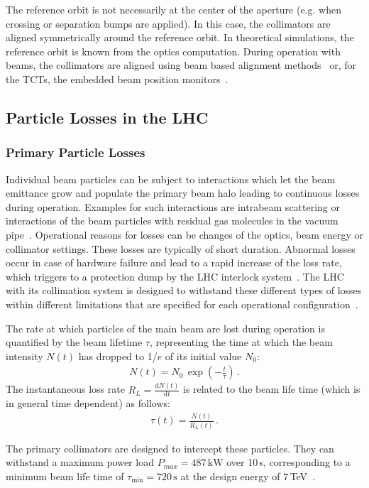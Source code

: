 The reference orbit is not necessarily at the center of the aperture (e.g. when crossing or separation bumps are applied). In this case, the collimators are aligned symmetrically around the reference orbit. In theoretical simulations, the reference orbit is known from the optics computation. During operation with beams, the collimators are aligned using beam based alignment methods~\cite{ipac2011:thpz034} or, for the TCTs, the embedded beam position monitors~\cite{accnote:150028}.



%
\subsection{Particle Losses in the LHC}
%
\subsubsection{Primary Particle Losses}
%
Individual beam particles can be subject to interactions which let the beam emittance grow and populate the primary beam halo leading to continuous losses during operation. Examples for such interactions are intrabeam scattering or interactions of the beam particles with residual gas molecules in the vacuum pipe~\cite{}. Operational reasons for losses can be changes of the optics, beam energy or collimator settings. These losses are typically of short duration. Abnormal losses occur in case of hardware failure and lead to a rapid increase of the loss rate, which triggers to a protection dump by the LHC interlock system~\citedr. The LHC with its collimation system is designed to withstand these different types of losses within different limitations that are specified for each operational configuration~\citedr.

The rate at which particles of the main beam are lost during operation is quantified by the beam lifetime $\tau$, representing the time at which the beam intensity $N(t)$ has dropped to 1/$e$ of its initial value $N_0$:
%
\begin{align}
   N(t) = N_0 \, \exp \left( - \frac{t}{\tau} \right) \, .
\end{align}
%
The instantaneous loss rate $R_L = \frac{\mathrm{d} N(t)}{\mathrm{d}t}$ is related to the beam life time (which is in general time dependent) as follows:
%
\begin{align}
  \tau(t) = \frac{N(t)}{R_L(t)} \, . \label{eq:taudef}
\end{align}
%


The primary collimators are designed to intercept these particles. They can withstand a maximum power load $P_{max}= 487\,\text{kW}$ over 10$\,$s, corresponding to a minimum beam life time of $\tau_\text{min}=720\,\text{s}$ at the design energy of $7\,$TeV~\cite{EPAC02:TUAGB01}. 

